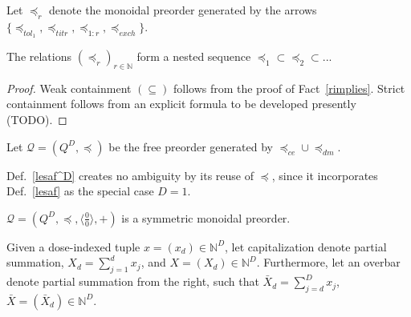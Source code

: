 \documentclass{article}
\newcommand{\N}{\mathbb{N}}
\newcommand{\Q}{\ensuremath{\mathcal{Q}}}
\begin{document}
\begin{nota}
  Let $\preceq_r$ denote the monoidal preorder generated by the arrows $\{\preceq_{tol_1}, \preceq_{titr}, \preceq_{1:r}, \preceq_{exch}\}$.
\end{nota}

\begin{fact}
  The relations $(\preceq_r)_{r \in \N}$ form a nested sequence $\preceq_1 \subset \preceq_2 \subset ...$
\end{fact}
\begin{proof}
  Weak containment $(\subseteq)$ follows from the proof of Fact~\ref{rimplies}.  Strict containment follows from an explicit formula to be developed presently (TODO).
\end{proof}

\begin{defn}\label{lesaf^D}
  Let $\Q = (Q^D,\preceq)$ be the free preorder generated by $\preceq_{ce} \cup \preceq_{dm}$.
\end{defn}

\begin{fact}
  Def.~\ref{lesaf^D} creates no ambiguity by its reuse of $\preceq$, since it incorporates Def.~\ref{lesaf} as the special case $D=1$.
\end{fact}

\begin{fact}\label{symon}
  $\Q = (Q^D,\preceq,\langle\frac{0}{0}\rangle,+)$ is a symmetric monoidal preorder.
\end{fact}

\begin{nota}
  Given a dose-indexed tuple $x = (x_d) \in \N^D$, let capitalization denote partial summation, $X_d = \sum_{j=1}^d x_j$, and $X = (X_d) \in \N^D$.  Furthermore, let an overbar denote partial summation from the right, such that $\bar{X}_d = \sum_{j=d}^D x_j$, $\bar{X} = (\bar{X}_d) \in \N^D$.
\end{nota}
\end{document}
